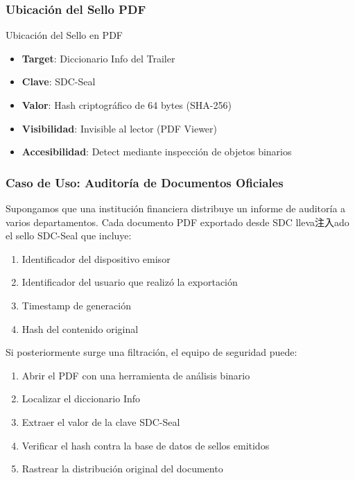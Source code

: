 
\subsubsection{Ubicación del Sello PDF}

\begin{caja}{Ubicación del Sello en PDF}
\begin{itemize}
\item \textbf{Target}: Diccionario Info del Trailer
\item \textbf{Clave}: SDC-Seal
\item \textbf{Valor}: Hash criptográfico de 64 bytes (SHA-256)
\item \textbf{Visibilidad}: Invisible al lector (PDF Viewer)
\item \textbf{Accesibilidad}: Detect mediante inspección de objetos binarios
\end{itemize}
\end{caja}

\subsubsection{Caso de Uso: Auditoría de Documentos Oficiales}

Supongamos que una institución financiera distribuye un informe de auditoría a varios departamentos. Cada documento PDF exportado desde SDC lleva注入ado el sello SDC-Seal que incluye:

\begin{enumerate}
\item Identificador del dispositivo emisor
\item Identificador del usuario que realizó la exportación
\item Timestamp de generación
\item Hash del contenido original
\end{enumerate}

Si posteriormente surge una filtración, el equipo de seguridad puede:

\begin{enumerate}
\item Abrir el PDF con una herramienta de análisis binario
\item Localizar el diccionario Info
\item Extraer el valor de la clave SDC-Seal
\item Verificar el hash contra la base de datos de sellos emitidos
\item Rastrear la distribución original del documento
\end{enumerate}


